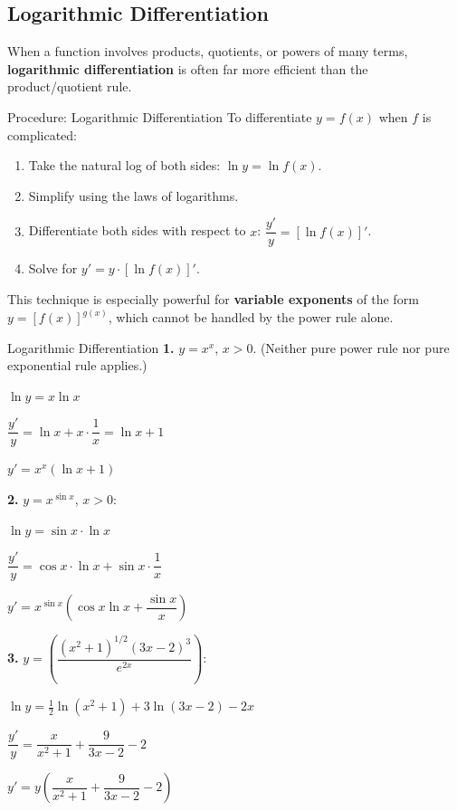 \documentclass[12pt, a4paper]{article}
\theoremstyle{definition}
\begin{document}
\subsection{Logarithmic Differentiation}

When a function involves products, quotients, or powers of many terms, \textbf{logarithmic differentiation} is often far more efficient than the product/quotient rule.

\begin{keybox}{Procedure: Logarithmic Differentiation}
To differentiate $y = f(x)$ when $f$ is complicated:
\begin{enumerate}
  \item Take the natural log of both sides: $\ln y = \ln f(x)$.
  \item Simplify using the laws of logarithms.
  \item Differentiate both sides with respect to $x$: $\dfrac{y'}{y} = [\ln f(x)]'$.
  \item Solve for $y' = y \cdot [\ln f(x)]'$.
\end{enumerate}
This technique is especially powerful for \textbf{variable exponents} of the form $y = [f(x)]^{g(x)}$, which cannot be handled by the power rule alone.
\end{keybox}

\begin{exbox}{Logarithmic Differentiation}
\textbf{1.} $y = x^x$, $x > 0$. (Neither pure power rule nor pure exponential rule applies.)

$\ln y = x \ln x$

$\dfrac{y'}{y} = \ln x + x \cdot \dfrac{1}{x} = \ln x + 1$

$y' = x^x(\ln x + 1)$

\textbf{2.} $y = x^{\sin x}$, $x > 0$:

$\ln y = \sin x \cdot \ln x$

$\dfrac{y'}{y} = \cos x \cdot \ln x + \sin x \cdot \dfrac{1}{x}$

$y' = x^{\sin x}\!\left(\cos x\ln x + \dfrac{\sin x}{x}\right)$

\textbf{3.} $y = \left(\dfrac{(x^2+1)^{1/2}(3x-2)^3}{e^{2x}}\right)$:

$\ln y = \tfrac{1}{2}\ln(x^2+1) + 3\ln(3x-2) - 2x$

$\dfrac{y'}{y} = \dfrac{x}{x^2+1} + \dfrac{9}{3x-2} - 2$

$y' = y\left(\dfrac{x}{x^2+1}+\dfrac{9}{3x-2}-2\right)$
\end{exbox}
\end{document}
